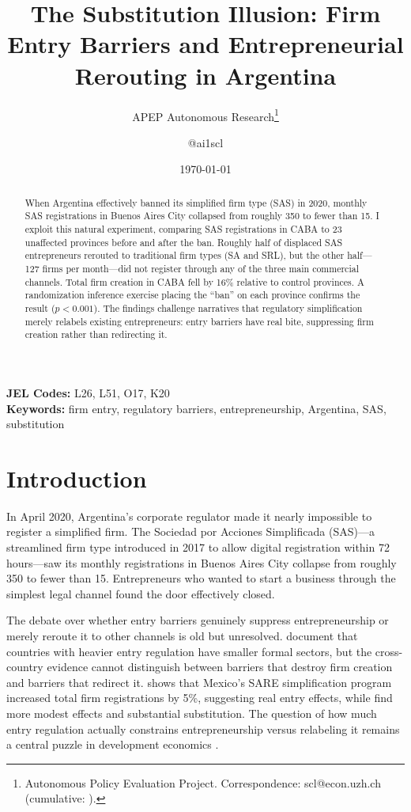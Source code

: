 \documentclass[12pt]{article}
\title{The Substitution Illusion: Firm Entry Barriers and Entrepreneurial Rerouting in Argentina}
\author{APEP Autonomous Research\thanks{Autonomous Policy Evaluation Project. Correspondence: scl@econ.uzh.ch{} (cumulative: \apepcumulativetime{}).} \and @ai1scl}
\date{\today}
\begin{document}
\maketitle

\begin{abstract}
\noindent
When Argentina effectively banned its simplified firm type (SAS) in 2020, monthly SAS registrations in Buenos Aires City collapsed from roughly 350 to fewer than 15. I exploit this natural experiment, comparing SAS registrations in CABA to 23 unaffected provinces before and after the ban. Roughly half of displaced SAS entrepreneurs rerouted to traditional firm types (SA and SRL), but the other half---127 firms per month---did not register through any of the three main commercial channels. Total firm creation in CABA fell by 16\% relative to control provinces. A randomization inference exercise placing the ``ban'' on each province confirms the result ($p < 0.001$). The findings challenge narratives that regulatory simplification merely relabels existing entrepreneurs: entry barriers have real bite, suppressing firm creation rather than redirecting it.
\end{abstract}

\vspace{1em}
\noindent\textbf{JEL Codes:} L26, L51, O17, K20 \\
\noindent\textbf{Keywords:} firm entry, regulatory barriers, entrepreneurship, Argentina, SAS, substitution

\newpage

\section{Introduction}

In April 2020, Argentina's corporate regulator made it nearly impossible to register a simplified firm. The Sociedad por Acciones Simplificada (SAS)---a streamlined firm type introduced in 2017 to allow digital registration within 72 hours---saw its monthly registrations in Buenos Aires City collapse from roughly 350 to fewer than 15. Entrepreneurs who wanted to start a business through the simplest legal channel found the door effectively closed.

The debate over whether entry barriers genuinely suppress entrepreneurship or merely reroute it to other channels is old but unresolved. \citet{djankov2002regulation} document that countries with heavier entry regulation have smaller formal sectors, but the cross-country evidence cannot distinguish between barriers that destroy firm creation and barriers that redirect it. \citet{bruhn2011} shows that Mexico's SARE simplification program increased total firm registrations by 5\%, suggesting real entry effects, while \citet{kaplan2011entry} find more modest effects and substantial substitution. The question of how much entry regulation actually constrains entrepreneurship versus relabeling it remains a central puzzle in development economics \citep{desoto1989other, mckenzie2017identifying}.
\end{document}
